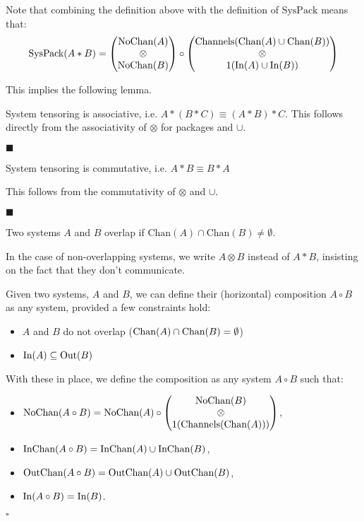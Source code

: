 Note that combining the definition above with the definition of $\text{SysPack}$
means that:
$$
\text{SysPack}(A * B) =
\begin{pmatrix}
\text{NoChan}(A)\cr
\otimes\cr
\text{NoChan}(B)\cr
\end{pmatrix}
\circ
\begin{pmatrix}
\text{Channels}(\text{Chan}(A) \cup \text{Chan}(B))\cr
\otimes\cr
1(\text{In}(A) \cup \text{In}(B))\cr
\end{pmatrix}
$$

This implies the following lemma.

\begin{lemma}
System tensoring is associative, i.e. $A * (B * C) \equiv (A * B) * C$.
 This follows directly from the associativity
of $\otimes$ for packages and $\cup$.

$\blacksquare$
\end{lemma}

\begin{lemma}
System tensoring is commutative, i.e. $A * B \equiv B * A$

 This follows from the commutativity of $\otimes$ and $\cup$.

$\blacksquare$
\end{lemma}

\begin{definition}
Two systems $A$ and $B$ overlap if $\text{Chan}(A) \cap \text{Chan}(B) \neq \emptyset$.

In the case of non-overlapping systems, we write $A \otimes B$ instead of $A * B$,
insisting on the fact that they don't communicate.
\end{definition}

\begin{definition}
Given two systems, $A$ and $B$, we can define their (horizontal) composition
$A \circ B$ as any system, provided a few constraints hold:
\begin{itemize}
\item $A$ and $B$ do not overlap ($\text{Chan}(A) \cap \text{Chan}(B) = \emptyset$)
\item $\text{In}(A) \subseteq \text{Out}(B)$
\end{itemize}

With these in place, we define the composition as any system $A \circ B$ such that:
\begin{itemize}
  \item $\text{NoChan}(A \circ B) = \text{NoChan}(A) \circ \begin{pmatrix}
    \text{NoChan}(B)\cr
    \otimes\cr
    1(\text{Channels}(\text{Chan}(A)))
  \end{pmatrix}
    $,
  \item $\text{InChan}(A \circ B) = \text{InChan}(A) \cup \text{InChan}(B)$,
  \item $\text{OutChan}(A \circ B) = \text{OutChan}(A) \cup \text{OutChan}(B)$,
  \item $\text{In}(A \circ B) = \text{In}(B)$.
\end{itemize}

$\square$
\end{definition}

